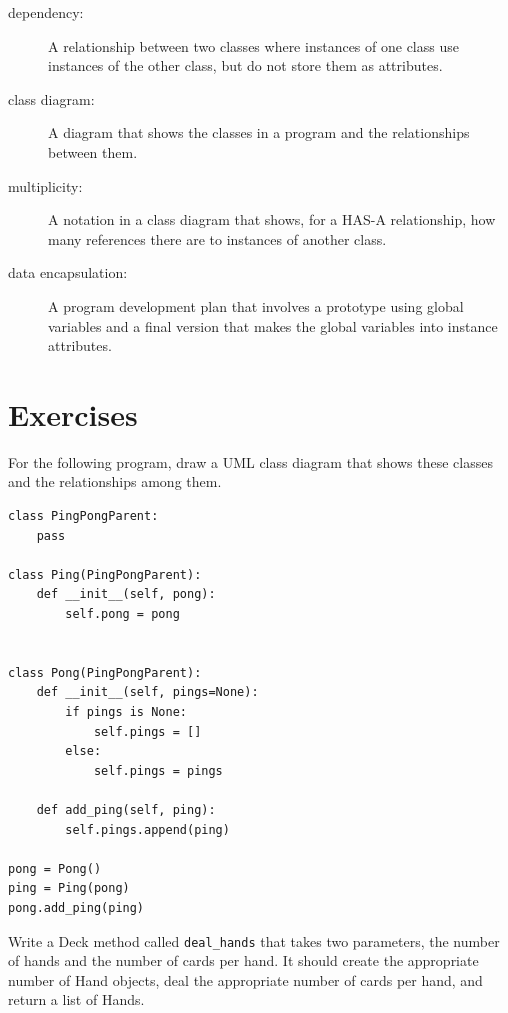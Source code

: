 \documentclass[10pt]{book}
\begin{document}
\begin{description}
\item[dependency:] A relationship between two classes
where instances of one class use instances of the other class,
but do not store them as attributes.

\item[class diagram:] A diagram that shows the classes in a program
and the relationships between them.

\item[multiplicity:] A notation in a class diagram that shows, for
a HAS-A relationship, how many references there are to instances
of another class.

\item[data encapsulation:]  A program development plan that
involves a prototype using global variables and a final version
that makes the global variables into instance attributes. 

\end{description}


\section{Exercises}

\begin{exercise}
For the following program, draw a UML class diagram that shows
these classes and the relationships among them.

\begin{verbatim}
class PingPongParent:
    pass

class Ping(PingPongParent):
    def __init__(self, pong):
        self.pong = pong


class Pong(PingPongParent):
    def __init__(self, pings=None):
        if pings is None:
            self.pings = []
        else:
            self.pings = pings

    def add_ping(self, ping):
        self.pings.append(ping)

pong = Pong()
ping = Ping(pong)
pong.add_ping(ping)
\end{verbatim}


\end{exercise}



\begin{exercise}
Write a Deck method called \verb"deal_hands" that
takes two parameters, the number of hands and the number of cards per
hand.  It should create the appropriate number of Hand objects, deal
the appropriate number of cards per hand, and return a list of Hands.
\end{exercise}
\end{document}
